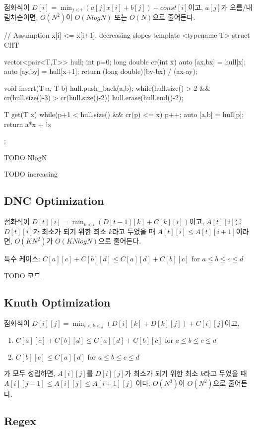점화식이 $D[i] = \min_{j<i}(a[j]x[i] + b[j]) + const[i]$이고, $a[j]$가 오름/내림차순이면, $O(N^2)$이 $O(NlogN)$ 또는 $O(N)$으로 줄어든다.

\begin{cpp}
// Assumption x[i] <= x[i+1], decreasing slopes
template <typename T>
struct CHT{
  vector<pair<T,T>> hull; int p=0;
  long double cr(int x){
    auto [ax,bx] = hull[x]; auto [ay,by] = hull[x+1];
    return (long double)(by-bx) / (ax-ay);
  }

  void insert(T a, T b){
    hull.push_back({a,b});
    while(hull.size() > 2 && cr(hull.size()-3) >
      cr(hull.size()-2)) hull.erase(hull.end()-2);
  }

  T get(T x){
    while(p+1 < hull.size() && cr(p) <= x) p++;
    auto [a,b] = hull[p];
    return a*x + b;
  }
};
\end{cpp}

TODO NlogN

TODO increasing

\subsection{DNC Optimization}

점화식이 $D[t][i] = \min_{k<i}(D[t-1][k] + C[k][i])$이고, $A[t][i]$를 $D[t][i]$가 최소가 되기 위한 최소 $k$라고 두었을 때 $A[t][i] \leq A[t][i+1]$이라면, $O(KN^2)$가 $O(KNlogN)$으로 줄어든다.

특수 케이스: $C[a][c]+C[b][d] \leq C[a][d]+C[b][c]$ for $a \leq b \leq c \leq d$

TODO 코드

\subsection{Knuth Optimization}

점화식이 $D[i][j] = \min_{i<k<j}(D[i][k]+D[k][j])+C[i][j]$이고, \begin{enumerate}
    \item $C[a][c]+C[b][d] \leq C[a][d]+C[b][c]$ for $a \leq b \leq c \leq d$
    \item $C[b][c] \leq C[a][d]$ for $a \leq b \leq c \leq d$
\end{enumerate}

가 모두 성립하면, $A[i][j]$를 $D[i][j]$가 최소가 되기 위한 최소 $k$라고 두었을 때 $A[i][j-1] \leq A[i][j] \leq A[i+1][j]$ 이다. $O(N^3)$이 $O(N^2)$으로 줄어든다.

\subsection{Regex}

